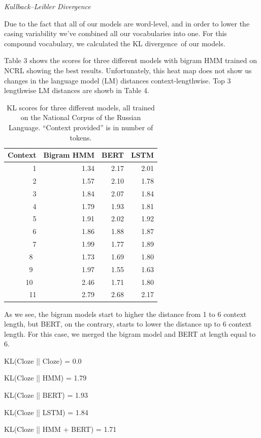 \documentclass[a4paper]{article}
\newcommand{\head}[1]{\vspace{0.5em}\emph{#1}\vspace{0.25em}}
\begin{document}
\head{Kullback–Leibler Divergence}

Due to the fact that all of our models are word-level, and in order to lower the casing variability we've combined all our vocabularies into one. For this compound vocabulary, we calculated the KL divergence of our models.

Table 3 shows the scores for three different models with
bigram HMM trained on NCRL showing the best results. Unfortunately, this heat map does not show us changes in the language model (LM) distances context-lengthwise. Top 3 lengthwise LM distances are showb in Table 4.

\begin{table}
\centering

\caption{KL scores for three different models, all trained on the
National Corpus of the Russian Language. ``Context provided'' is in number
of tokens.
\newline}

\begin{tabular}{rrrr}
\textbf{Context} &
\textbf{Bigram HMM} &
\textbf{BERT} &
\textbf{LSTM} \\
\hline
1 &
1.34 &
2.17 &
2.01 \\
2 &
1.57 &
2.10 &
1.78 \\
3 &
1.84 &
2.07 &
1.84 \\
4 &
1.79 &
1.93 &
1.81 \\
5 &
1.91 &
2.02 &
1.92 \\
6 &
1.86 &
1.88 &
1.87 \\
7 &
1.99 &
1.77 &
1.89 \\
8 &
1.73 &
1.69 &
1.80 \\
9 &
1.97 &
1.55 &
1.63 \\
10 &
2.46 &
1.71 &
1.80 \\
11 &
2.79 &
2.68 &
2.17
\end{tabular}
\end{table}

As we see, the bigram models start to higher the distance from 1 to 6 context length, but BERT, on the contrary, starts to lower the distance up to 6 context length. For this case, we merged the bigram model and BERT at length equal to 6.

KL(Cloze || Cloze) = 0.0

KL(Cloze || HMM) = 1.79

KL(Cloze || BERT) = 1.93

KL(Cloze || LSTM) = 1.84

KL(Cloze || HMM + BERT) = 1.71
\end{document}
